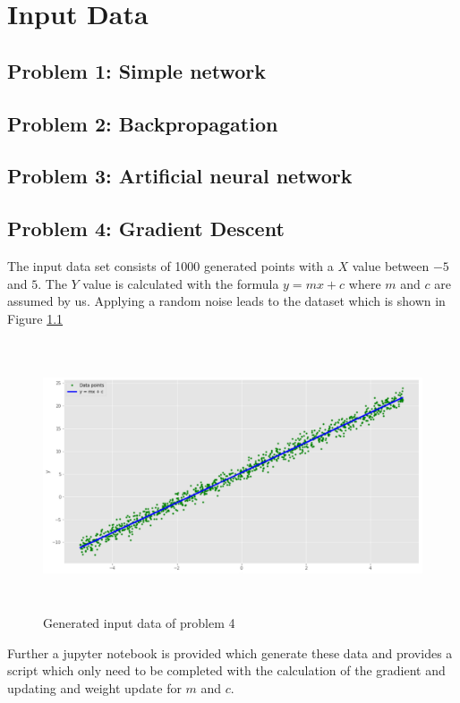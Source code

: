 \chapter{Input Data}
\section{Problem 1: Simple network}
\section{Problem 2: Backpropagation}
\section{Problem 3: Artificial neural network}
\section{Problem 4: Gradient Descent}

The input data set consists of 1000 generated points with a $X$ value between $-5$ and $5$.
The $Y$ value is calculated with the formula $ y = mx + c $ where $m$ and $c$ are assumed by us.
Applying a random noise leads to the dataset which is shown in Figure \ref{problem4_imput_data}

\begin{figure}[h]
	\centering
	\includegraphics[height=8cm]{img/problem4_imput_data.png}
	\caption{Generated input data of problem 4}
    \label{problem4_imput_data}
\end{figure}

Further a jupyter notebook is provided which generate these data and provides a script which only need to be completed with the calculation of the gradient and updating and weight update for $m$ and $c$.


